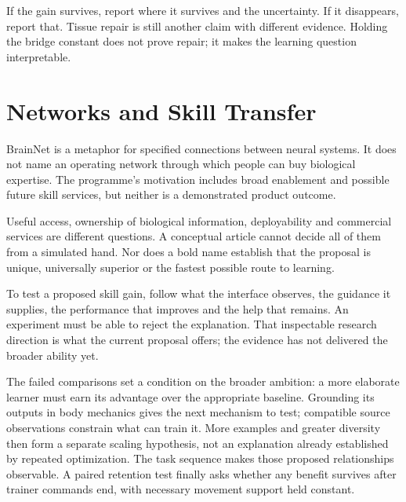If the gain survives, report where it survives and the uncertainty. If it disappears, report that. Tissue repair is still another claim with different evidence. Holding the bridge constant does not prove repair; it makes the learning question interpretable.\par

\section{Networks and Skill Transfer}

BrainNet is a metaphor for specified connections between neural systems. It does not name an operating network through which people can buy biological expertise. The programme's motivation includes broad enablement and possible future skill services, but neither is a demonstrated product outcome.\par

Useful access, ownership of biological information, deployability and commercial services are different questions. A conceptual article cannot decide all of them from a simulated hand. Nor does a bold name establish that the proposal is unique, universally superior or the fastest possible route to learning.\par

To test a proposed skill gain, follow what the interface observes, the guidance it supplies, the performance that improves and the help that remains. An experiment must be able to reject the explanation. That inspectable research direction is what the current proposal offers; the evidence has not delivered the broader ability yet.\par

The failed comparisons set a condition on the broader ambition: a more elaborate learner must earn its advantage over the appropriate baseline. Grounding its outputs in body mechanics gives the next mechanism to test; compatible source observations constrain what can train it. More examples and greater diversity then form a separate scaling hypothesis, not an explanation already established by repeated optimization. The task sequence makes those proposed relationships observable. A paired retention test finally asks whether any benefit survives after trainer commands end, with necessary movement support held constant.







